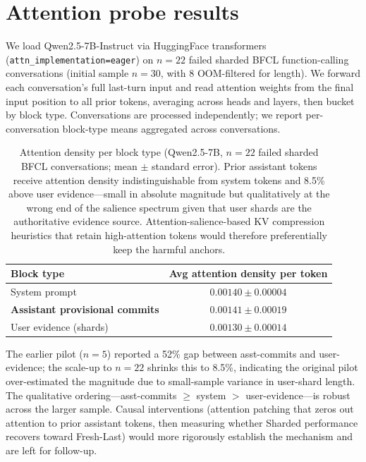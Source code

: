 \documentclass{article}
\begin{document}
\section{Attention probe results}
\label{app:attn}

We load Qwen2.5-7B-Instruct via HuggingFace transformers (\texttt{attn\_implementation=eager}) on $n=22$ failed sharded BFCL function-calling conversations (initial sample $n=30$, with 8 OOM-filtered for length). We forward each conversation's full last-turn input and read attention weights from the final input position to all prior tokens, averaging across heads and layers, then bucket by block type. Conversations are processed independently; we report per-conversation block-type means aggregated across conversations.

\begin{table}[h]
\centering
\caption{Attention density per block type (Qwen2.5-7B, $n=22$ failed sharded BFCL conversations; mean $\pm$ standard error). Prior assistant tokens receive attention density indistinguishable from system tokens and 8.5\% above user evidence---small in absolute magnitude but qualitatively at the wrong end of the salience spectrum given that user shards are the authoritative evidence source. Attention-salience-based KV compression heuristics that retain high-attention tokens would therefore preferentially keep the harmful anchors.}
\label{tab:attn-density}
\begin{tabular}{lc}
\toprule
Block type & Avg attention density per token \\
\midrule
System prompt & $0.00140 \pm 0.00004$ \\
\textbf{Assistant provisional commits} & $\mathbf{0.00141 \pm 0.00019}$ \\
User evidence (shards) & $0.00130 \pm 0.00014$ \\
\bottomrule
\end{tabular}
\end{table}

The earlier pilot ($n=5$) reported a 52\% gap between asst-commits and user-evidence; the scale-up to $n=22$ shrinks this to 8.5\%, indicating the original pilot over-estimated the magnitude due to small-sample variance in user-shard length. The qualitative ordering---asst-commits $\geq$ system $>$ user-evidence---is robust across the larger sample. Causal interventions (attention patching that zeros out attention to prior assistant tokens, then measuring whether Sharded performance recovers toward Fresh-Last) would more rigorously establish the mechanism and are left for follow-up.
\end{document}
